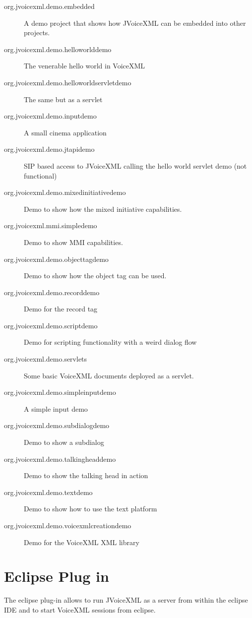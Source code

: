 \documentclass[11pt,a4paper]{article}
\begin{document}
\begin{description}
\item[org.jvoicexml.demo.embedded] A demo project that shows how JVoiceXML can
be embedded into other projects.
\item[org.jvoicexml.demo.helloworlddemo] The venerable hello world in Voice\-XML
\item[org.jvoicexml.demo.helloworldservletdemo] The same but as a servlet
\item[org.jvoicexml.demo.inputdemo] A small cinema application
\item[org.jvoicexml.demo.jtapidemo] SIP based access to JVoiceXML calling the
hello world servlet demo (not functional)
\item[org.jvoicexml.demo.mixedinitiativedemo] Demo to show how the mix\-ed
initiative capabilities.
\item[org.jvoicexml.mmi.simpledemo] Demo to show MMI capabilities.
\item[org.jvoicexml.demo.objecttagdemo] Demo to show how the object tag can be
used.
\item[org.jvoicexml.demo.recorddemo] Demo for the record tag
\item[org.jvoicexml.demo.scriptdemo] Demo for scripting functionality with a
weird dialog flow
\item[org.jvoicexml.demo.servlets] Some basic VoiceXML documents deployed as a
servlet.
\item[org.jvoicexml.demo.simpleinputdemo] A simple input demo
\item[org.jvoicexml.demo.subdialogdemo] Demo to show a subdialog
\item[org.jvoicexml.demo.talkingheaddemo] Demo to show the talking head in action
\item[org.jvoicexml.demo.textdemo] Demo to show how to use the text platform
\item[org.jvoicexml.demo.voicexmlcreationdemo] Demo for the VoiceXML XML library
\end{description}

\section{Eclipse Plug in}

The eclipse plug-in allows to run JVoiceXML as a server from within the eclipse
IDE and to start VoiceXML sessions from eclipse.
\end{document}
